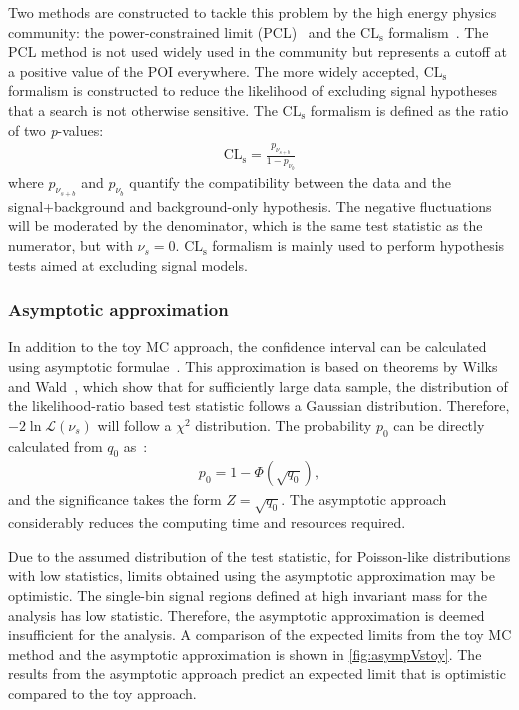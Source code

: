 Two methods are constructed to tackle this problem by the high energy physics community: the power-constrained limit (PCL)~\cite{PhysRevLett.122.231801} and the $\mathrm{CL}_\mathrm{s}$ formalism~\cite{JUNK1999435,Read_2002}. The PCL method is not used widely used in the community but represents a cutoff at a positive value of the POI everywhere. The more widely accepted, $\mathrm{CL}_\mathrm{s}$ formalism is constructed to reduce the likelihood of excluding signal hypotheses that a search is not otherwise sensitive. The $\mathrm{CL}_\mathrm{s}$ formalism is defined as the ratio of two \emph{p}-values:
\begin{equation}
    \label{eq:cls}
    \begin{aligned}
        \mathrm{CL}_\mathrm{s} = \frac{p_{\nu_{s+b}}}{1-p_{\nu_{b}}}
    \end{aligned}
\end{equation}
where $p_{\nu_{s+b}}$ and $p_{\nu_{b}}$ quantify the compatibility between the data and the signal+background and background-only hypothesis. The negative fluctuations will be moderated by the denominator, which is the same test statistic as the numerator, but with $\nu_s = 0$. $\mathrm{CL}_\mathrm{s}$ formalism is mainly used to perform hypothesis tests aimed at excluding signal models. 

\subsubsection{Asymptotic approximation}
In addition to the toy MC approach, the confidence interval can be calculated using asymptotic formulae~\cite{Cowan:2010js}. This approximation is based on theorems by Wilks and Wald~\cite{wilks1938}, which show that for sufficiently large data sample, the distribution of the likelihood-ratio based test statistic follows a Gaussian distribution. Therefore, $-2\ln\mathcal{L}(\nu_s)$ will follow a $\chi^2$ distribution. The probability $p_0$ can be directly calculated from $q_0$ as~\cite{Cowan:2010js}:
\begin{equation}
    \label{eq:p0_asymp}
    \begin{aligned}
        p_0 = 1 - \Phi\left(\sqrt{q_0}\right),
    \end{aligned}
\end{equation}
and the significance takes the form $Z = \sqrt{q_0}$. The asymptotic approach considerably reduces the computing time and resources required. 

Due to the assumed distribution of the test statistic, for Poisson-like distributions with low statistics, limits obtained using the asymptotic approximation may be optimistic. The single-bin signal regions defined at high invariant mass for the analysis has low statistic. Therefore, the asymptotic approximation is deemed insufficient for the analysis. A comparison of the expected limits from the toy MC method and the asymptotic approximation is shown in \cref{fig:asympVstoy}. The results from the asymptotic approach predict an expected limit that is optimistic compared to the toy approach. 

